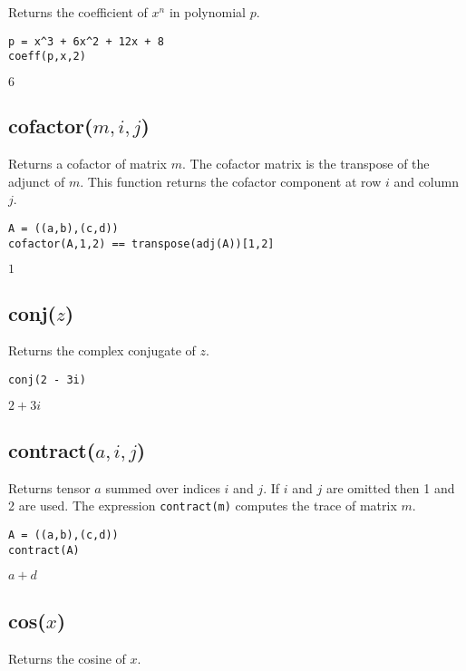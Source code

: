 Returns the coefficient of $x^n$ in polynomial $p$.

{\color{blue}
\begin{verbatim}
p = x^3 + 6x^2 + 12x + 8
coeff(p,x,2)
\end{verbatim}
}

\noindent
$6$

\subsection*{cofactor($m,i,j$)}

Returns a cofactor of matrix $m$.
The cofactor matrix is the transpose of the adjunct of $m$.
This function returns the cofactor component
at row $i$ and column $j$.

{\color{blue}
\begin{verbatim}
A = ((a,b),(c,d))
cofactor(A,1,2) == transpose(adj(A))[1,2]
\end{verbatim}
}

\noindent
$1$

\subsection*{conj($z$)}

Returns the complex conjugate of $z$.

{\color{blue}
\begin{verbatim}
conj(2 - 3i)
\end{verbatim}
}

\noindent
$2 + 3 i$

\subsection*{contract($a,i,j$)}

Returns tensor $a$ summed over indices $i$ and $j$.
If $i$ and $j$ are omitted then 1 and 2 are used.
The expression {\tt contract(m)} computes the trace of matrix $m$.

{\color{blue}
\begin{verbatim}
A = ((a,b),(c,d))
contract(A)
\end{verbatim}
}

\noindent
$a + d$

\subsection*{cos($x$)}

Returns the cosine of $x$.

